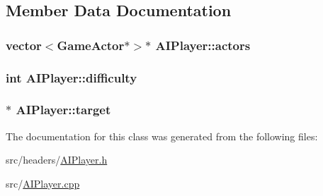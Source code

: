 \subsection{Member Data Documentation}
\hypertarget{class_a_i_player_a624129174d82f2462320badcd3bfa598}{
\subsubsection[{actors}]{\setlength{\rightskip}{0pt plus 5cm}vector$<${\bf Game\+Actor}$\ast$$>$$\ast$ A\+I\+Player\+::actors\hspace{0.3cm}{\ttfamily [protected]}}}\label{class_a_i_player_a624129174d82f2462320badcd3bfa598}
\hypertarget{class_a_i_player_ae4bc7d7fef8e20ac68867af09b365e21}{
\subsubsection[{difficulty}]{\setlength{\rightskip}{0pt plus 5cm}int A\+I\+Player\+::difficulty\hspace{0.3cm}{\ttfamily [protected]}}}\label{class_a_i_player_ae4bc7d7fef8e20ac68867af09b365e21}
\hypertarget{class_a_i_player_a9380be8a90d97dc0419cb91dfd0e8918}{
\subsubsection[{target}]{$\ast$ A\+I\+Player\+::target\hspace{0.3cm}{\ttfamily [protected]}}}\label{class_a_i_player_a9380be8a90d97dc0419cb91dfd0e8918}


The documentation for this class was generated from the following files\+:\begin{DoxyCompactItemize}
\item 
src/headers/\hyperlink{_a_i_player_8h}{A\+I\+Player.\+h}\item 
src/\hyperlink{_a_i_player_8cpp}{A\+I\+Player.\+cpp}\end{DoxyCompactItemize}

